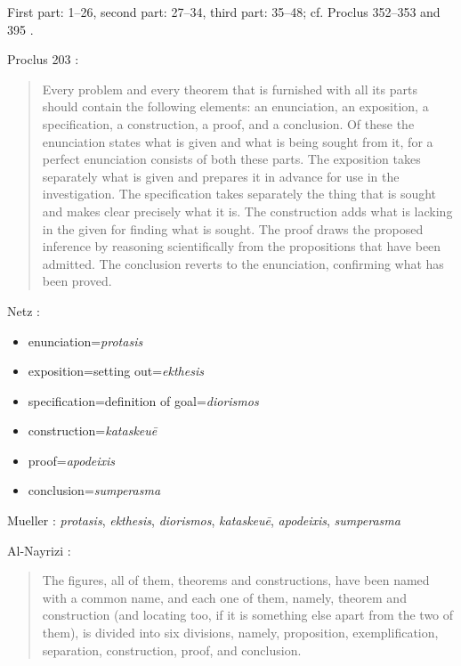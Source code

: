 \documentclass{article}
\begin{document}
First part: 1--26, second part: 27--34, third part: 35--48; cf. Proclus 352--353 \cite[p.~275]{proclus} and 395 \cite[p.~311]{proclus}.


Proclus 203 \cite[p.~159]{proclus}:

\begin{quote}
Every problem and every theorem that is furnished with all its parts
should contain the following elements: an enunciation, an
exposition, a specification, a construction, a proof, and a
conclusion. Of these the enunciation states what is given and
what is being sought from it, for a perfect enunciation consists
of both these parts. The exposition takes separately what is
given and prepares it in advance for use in the investigation.
The specification takes separately the thing that is sought and
makes clear precisely what it is. The construction adds what
is lacking in the given for finding what is sought. The proof
draws the proposed inference by reasoning scientifically from
the propositions that have been admitted. The conclusion
reverts to the enunciation, confirming what has been proved.
\end{quote}

Netz \cite[pp.~10--11]{netz}:

\begin{itemize}
\item[] enunciation={\em protasis}
\item[] exposition=setting out={\em ekthesis}
\item[] specification=definition of goal={\em diorismos}
\item[] construction={\em kataskeu\={e}}
\item[] proof={\em apodeixis}
\item[] conclusion={\em sumperasma}
\end{itemize}

Mueller \cite[p.~11]{mueller}: 
{\em protasis}, {\em ekthesis}, {\em diorismos}, {\em kataskeu\={e}}, {\em apodeixis}, {\em sumperasma} 

Al-Nayrizi \cite[p.~102]{alnayriziI}:

\begin{quote}
The figures, all of them, theorems and constructions, have
been named with a common name, and each one of them, namely,
theorem and construction (and locating too, if it is something else
apart from the two of them), is divided into six divisions, namely,
proposition, exemplification, separation, construction, proof, and
conclusion.
\end{quote}
\end{document}
